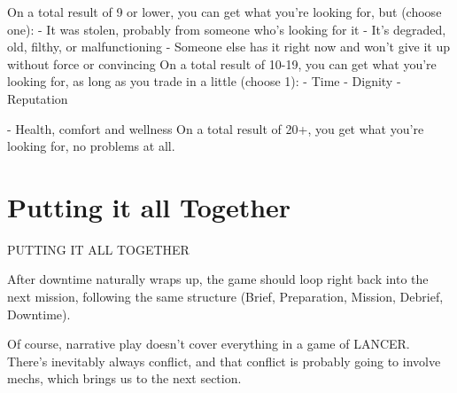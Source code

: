 On a total result of 9 or lower, you can get what you’re looking for, but (choose one):  
    -    It was stolen, probably from someone who’s looking for it  
    -    It’s degraded, old, filthy, or malfunctioning  
    -    Someone else has it right now and won’t give it up without force or convincing  
On a total result of 10-19, you can get what you’re looking for, as long as you trade in a little  
(choose 1):  
    -    Time  
    -    Dignity  
    -    Reputation  

                                                                                                                   


     -   Health, comfort and wellness  
On a total result of 20+, you get what you’re looking for, no problems at all. 

\section{Putting it all Together}
                                    PUTTING IT ALL TOGETHER  

After downtime naturally wraps up, the game should loop right back into the next mission,  
following the same structure (Brief, Preparation, Mission, Debrief, Downtime).  

Of course, narrative play doesn’t cover everything in a game of LANCER. There’s inevitably  
always conflict, and that conflict is probably going to involve mechs, which brings us to the next  
section.
 
  